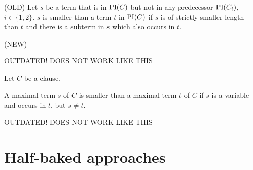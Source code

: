 \documentclass[,%
	paper=a4,%
	DIV14, 
	liststotoc,
	bibtotoc,
	draft=false,%
	numbers=noendperiod
]{scrartcl}
\begin{document}
\begin{defi}


	(OLD)
	Let $s$ be a term that is in $\operatorname{PI}(C)$ but not in any predecessor $\operatorname{PI}(C_i)$, $i \in \{1,2\}$. $s$ is smaller than a term $t$ in $\operatorname{PI}(C)$ if $s$ is of strictly smaller length than $t$ and there is a subterm in $s$ which also occurs in $t$.
\end{defi}

\begin{defi}
	\label{def:order}
	(NEW)

	OUTDATED! DOES NOT WORK LIKE THIS

	Let $C$ be a clause.

	A maximal term $s$ of $C$ is smaller than a maximal term $t$ of $C$ if $s$ is a variable and occurs in $t$, but $s\neq t$. 

	OUTDATED! DOES NOT WORK LIKE THIS

\end{defi}

\section{Half-baked approaches}
\end{document}

